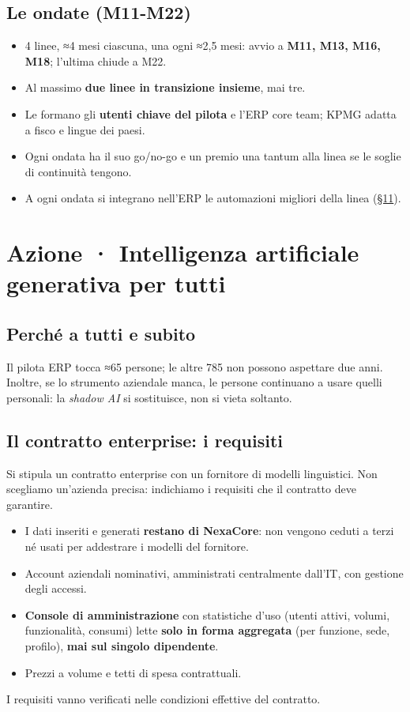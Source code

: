 \documentclass[11pt,a4paper]{article}
\begin{document}
\subsection{Le ondate (M11-M22)}\label{sec:9.6}
\begin{itemize}
\item 4 linee, ≈4 mesi ciascuna, una ogni ≈2,5 mesi: avvio a \textbf{M11, M13, M16, M18}; l'ultima chiude a M22.
\item Al massimo \textbf{due linee in transizione insieme}, mai tre.
\item Le formano gli \textbf{utenti chiave del pilota} e l'ERP core team; KPMG adatta a fisco e lingue dei paesi.
\item Ogni ondata ha il suo go/no-go e un premio una tantum alla linea se le soglie di continuità tengono.
\item A ogni ondata si integrano nell'ERP le automazioni migliori della linea (\hyperref[sec:11]{\S11}).
\end{itemize}

\section{Azione · Intelligenza artificiale generativa per tutti}\label{sec:10}

\subsection{Perché a tutti e subito}\label{sec:10.1}
Il pilota ERP tocca ≈65 persone; le altre 785 non possono aspettare due anni. Inoltre, se lo strumento aziendale manca, le persone continuano a usare quelli personali: la \emph{shadow AI} si sostituisce, non si vieta soltanto.

\subsection{Il contratto enterprise: i requisiti}\label{sec:10.2}
Si stipula un contratto enterprise con un fornitore di modelli linguistici. Non scegliamo un'azienda precisa: indichiamo i requisiti che il contratto deve garantire.
\begin{itemize}
\item I dati inseriti e generati \textbf{restano di NexaCore}: non vengono ceduti a terzi né usati per addestrare i modelli del fornitore.
\item Account aziendali nominativi, amministrati centralmente dall'IT, con gestione degli accessi.
\item \textbf{Console di amministrazione} con statistiche d'uso (utenti attivi, volumi, funzionalità, consumi) lette \textbf{solo in forma aggregata} (per funzione, sede, profilo), \textbf{mai sul singolo dipendente}.
\item Prezzi a volume e tetti di spesa contrattuali.
\end{itemize}
I requisiti vanno verificati nelle condizioni effettive del contratto.
\end{document}
